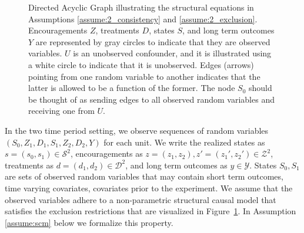 \begin{figure}[t]
\caption{
  Directed Acyclic Graph illustrating the structural equations in Assumptions \ref{assume:2_consistency} and \ref{assume:2_exclusion}.
  Encouragements $Z$, treatments $D$, states $S$, and long term outcomes $Y$ are represented by gray circles to indicate that they are observed variables.
  $U$ is an unobserved confounder, and it is illustrated using a white circle to indicate that it is unobserved.
  Edges (arrows) pointing from one random variable to another indicates that the latter is allowed to be a function of the former.
  The node $S_0$ should be thought of as sending edges to all observed random variables and receiving one from $U$.
}\label{fig:dag_1}
\end{figure}













    
    

    

In the two time period setting, we observe sequences of random variables $(S_0, Z_1, D_1, S_1, Z_2, D_2, Y)$ for each unit. We write the realized states as $s=(s_0, s_1) \in \mathcal{S}^2$, encouragements as $z=(z_1, z_2), z'=(z_1', z_2') \in \mathcal{Z}^2$, treatments as $d=(d_1, d_2) \in \mathcal{D}^2$, and long term outcomes as $y \in \mathcal{Y}$.
States $S_0, S_1$ are sets of observed random variables that may contain short term outcomes, time varying covariates, covariates prior to the experiment. We assume that the observed variables adhere to a non-parametric structural causal model that satisfies the exclusion restrictions that are visualized in Figure~\ref{fig:dag_1}. In Assumption \ref{assume:scm} below we formalize this property.

